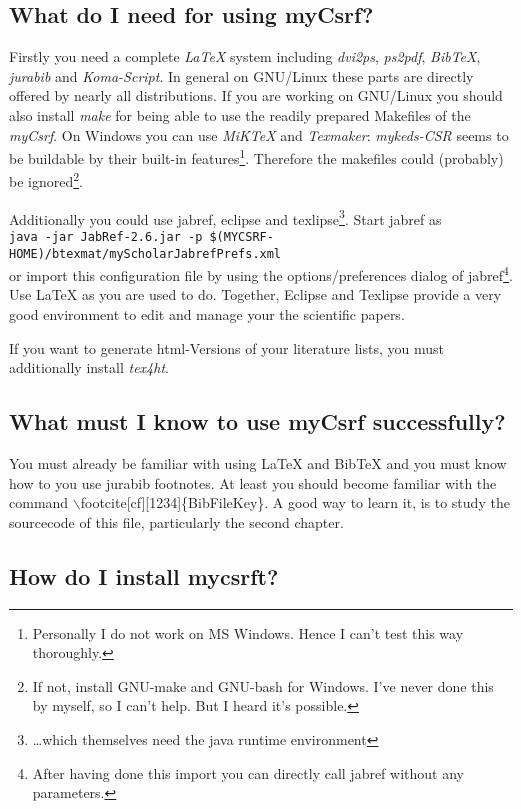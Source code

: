 \documentclass[
  DIV=calc,
  BCOR=5mm,
  11pt,
  headings=small,
  oneside,
  abstract=true,
  toc=bib,
  ngerman,english]{scrartcl}
\begin{document}
\subsection{What do I need for using myCsrf?}
Firstly you need a complete \textit{LaTeX} system including \textit{dvi2ps},
\textit{ps2pdf}, \textit{BibTeX}, \textit{jurabib} and \textit{Koma-Script}. In
general on GNU/Linux these parts are directly offered by nearly all
distributions. If you are working on GNU/Linux you should also install
\textit{make} for being able to use the readily prepared Makefiles of the
\textit{myCsrf}. On Windows you can use \textit{MiKTeX} and
\textit{Texmaker}: \textit{my\-keds-CSR} seems to be buildable by their built-in
features\footnote{Personally I do not work on MS Windows. Hence I can't test
this way thoroughly.}. Therefore the makefiles could (probably) be
ignored\footnote{If not, install GNU-make and GNU-bash for Windows. I've never
done this by myself, so I can't help. But I heard it's possible.}.

Additionally you could use jabref, eclipse and texlipse\footnote{\ldots which
themselves need the java runtime environment}. Start jabref as \\
\texttt{\footnotesize java -jar JabRef-2.6.jar -p
\$(MYCSRF-HOME)/btexmat/myScholarJabrefPrefs.xml}\\
or import this configuration file by using the options/preferences dialog of
jab\-ref\footnote{After having done this import you can directly call jabref
without any parameters.}. Use LaTeX as you are used to do. Together, Eclipse and
Texlipse provide a very good environment to edit and manage your the scientific
papers.

If you want to generate html-Versions of your literature lists, you must
additionally install \textit{tex4ht}.

\subsection{What must I know to use myCsrf successfully?}
You must already be familiar with using LaTeX and BibTeX and you must know how
to you use jurabib footnotes. At least you should become familiar with the
command $\backslash$footcite[cf][1234]\{BibFileKey\}. A good way to learn it, is to
study the sourcecode of this file, particularly the second chapter.

\subsection{How do I install mycsrft?}
\end{document}
